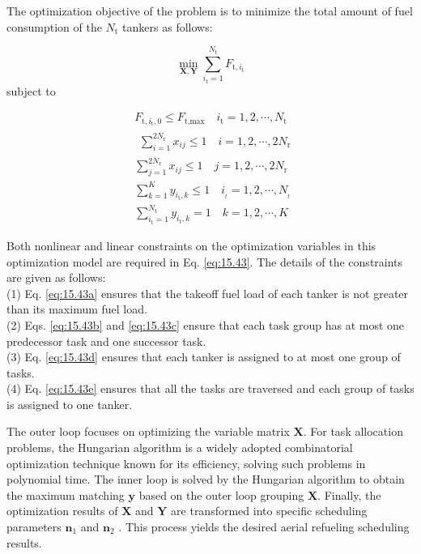 The optimization objective of the problem is to minimize the total amount of fuel consumption of the $	N_\text{t}$ tankers as follows:

\begin{equation}
\min_\mathbf{X,Y}\sum_{i_{\text{t}}=1}^{N_{\text{t}}}F_{\text{t},i_{\text{t}}}
\label{eq:15.42}
\end{equation}
subject to

\begin{subequations}
	\begin{align}
	&F_{\text{t},i_{\text{t}},0}\leq F_{\text{t},\text{max}}\quad i_{\text{t}}=1,2,\cdots,N_{\text{t}}\label{eq:15.43a} \\
	&\begin{aligned}\sum_{i=1}^{2N_{\text{r}}}x_{ij}\leq1\quad i=1,2,\cdots,2N_{\text{r}}\end{aligned} \label{eq:15.43b}\\
	&\sum_{j=1}^{2N_\text{r}}x_{ij}\leq1\quad j=1,2,\cdots,2N_\text{r}\label{eq:15.43c}\\
	&\sum_{k=1}^{K}y_{i_\text{t},k}\leq1\quad i_{_t}=1,2,\cdots,N_{_t}\label{eq:15.43d}\\
	&\sum_{i_\text{t}=1}^{N_\text{t}}y_{i_\text{t},k}=1\quad k=1,2,\cdots,K\label{eq:15.43e}
	\end{align}
	\label{eq:15.43}
\end{subequations}

Both nonlinear and linear constraints on the optimization variables in this optimization model are required in Eq. \ref{eq:15.43}. The details of the constraints are given as follows:\\
(1)	Eq. \ref{eq:15.43a} ensures that the takeoff fuel load of each tanker is not greater than its maximum fuel load.\\
(2)	Eqs. \ref{eq:15.43b} and \ref{eq:15.43c} ensure that each task group has at most one predecessor task and one successor task. \\
(3)	Eq. \ref{eq:15.43d} ensures that each tanker is assigned to at most one group of tasks.\\
(4)	Eq. \ref{eq:15.43e} ensures that all the tasks are traversed and each group of tasks is assigned to one tanker. 

The outer loop focuses on optimizing the variable matrix $\mathbf{X}$. For task allocation problems, the Hungarian algorithm is a widely adopted combinatorial optimization technique known for its efficiency, solving such problems in polynomial time.\cite{lopes2019fast} The inner loop is solved by the Hungarian algorithm to obtain the maximum matching $\mathbf{y}$ based on the outer loop grouping $\mathbf{X}$. Finally, the optimization results of $\mathbf{X}$ and $\mathbf{Y}$ are transformed into specific scheduling parameters $\mathbf{n}_1$ and $\mathbf{n}_2$  . This process yields the desired aerial refueling scheduling results.



